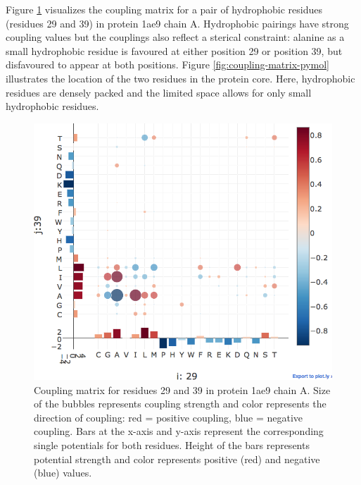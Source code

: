 \documentclass[12pt,a4paper,twoside]{book}
\theoremstyle{definition}
\theoremstyle{definition}
\theoremstyle{remark}
\begin{document}
Figure \ref{fig:coupling-matrix-hydrophobic-interaction} visualizes the
coupling matrix for a pair of hydrophobic residues (residues 29 and 39)
in protein 1ae9 chain A. Hydrophobic pairings have strong coupling
values but the couplings also reflect a sterical constraint: alanine as
a small hydrophobic residue is favoured at either position 29 or
position 39, but disfavoured to appear at both positions. Figure
\ref{fig:coupling-matrix-pymol} illustrates the location of the two
residues in the protein core. Here, hydrophobic residues are densely
packed and the limited space allows for only small hydrophobic residues.









\begin{figure}
\includegraphics[width=0.9\linewidth]{img/coupling_matrix_analysis/coupling_matrix_1ae9A00_29_39_notitle} \caption{Coupling matrix
for residues 29 and 39 in protein 1ae9 chain A. Size of the bubbles
represents coupling strength and color represents the direction of
coupling: red = positive coupling, blue = negative coupling. Bars at the
x-axis and y-axis represent the corresponding single potentials for both
residues. Height of the bars represents potential strength and color
represents positive (red) and negative (blue) values.}\label{fig:coupling-matrix-hydrophobic-interaction}
\end{figure}
\end{document}
